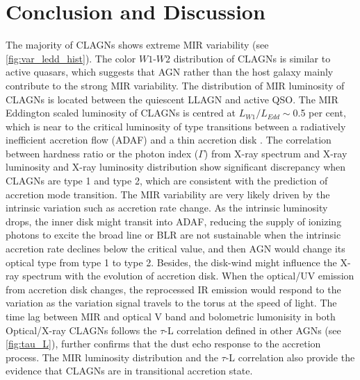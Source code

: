 \documentclass[linenumbers]{aastex631}
\begin{document}

%


\section{Conclusion and Discussion} \label{sec:dis}
The majority of CLAGNs shows extreme MIR variability (see \autoref{fig:var_ledd_hist}). The color $W1$-$W2$ distribution of CLAGNs is similar to active quasars, which suggests that AGN rather than the host galaxy mainly contribute to the strong MIR variability.  The distribution of MIR luminosity of CLAGNs is located between the quiescent LLAGN and active QSO. The MIR Eddington scaled luminosity of CLAGNs is centred at $L_{W1}/L_{Edd} \sim $0.5 per cent, which is near to the critical luminosity of type transitions between a radiatively inefficient accretion flow (ADAF) and a thin accretion disk \citep[e.g.][and references therein]{2009MNRAS.399..349G,2014ARA&A..52..529Y}. The correlation between hardness ratio or the photon index ($\Gamma$) from X-ray spectrum and X-ray luminosity \citep[e.g.][]{2020ApJ...890L..29A,2021MNRAS.506.4188L} and X-ray luminosity distribution \citep[e.g.][]{2021MNRAS.508..144G} show significant discrepancy when CLAGNs are type 1 and type 2, which are consistent with the prediction of accretion mode transition. The MIR variability are very likely driven by the intrinsic variation such as accretion rate change. As the intrinsic luminosity drops, the inner disk might transit into ADAF, reducing the supply of ionizing photons to excite the broad line or BLR are not sustainable when the intrinsic accretion rate declines below the critical value, and then AGN would change its optical type from type 1 to type 2. Besides, the disk-wind might influence the X-ray spectrum with the evolution of accretion disk.  When the optical/UV emission from accretion disk changes, the reprocessed IR emission would respond to the variation as the variation signal travels to the torus at the speed of light. The time lag between MIR and optical V band and bolometric lumonisity in both Optical/X-ray CLAGNs follows the $\tau$-L correlation defined in other AGNs (see \autoref{fig:tau_L}), further confirms that the dust echo response to the accretion process. The MIR luminosity distribution and the $\tau$-L correlation also provide the evidence that CLAGNs are in transitional accretion state. 
\end{document}

